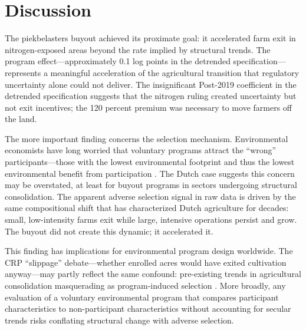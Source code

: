 \documentclass[12pt]{article}
\begin{document}
\section{Discussion}
\label{sec:discussion}

The piekbelasters buyout achieved its proximate goal: it accelerated farm exit in nitrogen-exposed areas beyond the rate implied by structural trends. The program effect---approximately 0.1 log points in the detrended specification---represents a meaningful acceleration of the agricultural transition that regulatory uncertainty alone could not deliver. The insignificant Post-2019 coefficient in the detrended specification suggests that the nitrogen ruling created uncertainty but not exit incentives; the 120 percent premium was necessary to move farmers off the land.

The more important finding concerns the selection mechanism. Environmental economists have long worried that voluntary programs attract the ``wrong'' participants---those with the lowest environmental footprint and thus the lowest environmental benefit from participation \citep{wu2001slippage, lubowski2006does, mason2012voluntary}. The Dutch case suggests this concern may be overstated, at least for buyout programs in sectors undergoing structural consolidation. The apparent adverse selection signal in raw data is driven by the same compositional shift that has characterized Dutch agriculture for decades: small, low-intensity farms exit while large, intensive operations persist and grow. The buyout did not create this dynamic; it accelerated it.

This finding has implications for environmental program design worldwide. The CRP ``slippage'' debate---whether enrolled acres would have exited cultivation anyway---may partly reflect the same confound: pre-existing trends in agricultural consolidation masquerading as program-induced selection \citep{feng2004clean, anderson2015fundamentals}. More broadly, any evaluation of a voluntary environmental program that compares participant characteristics to non-participant characteristics without accounting for secular trends risks conflating structural change with adverse selection.
\end{document}
